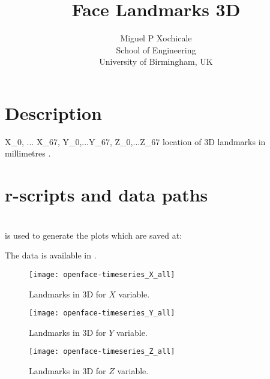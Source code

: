 \documentclass[a4paper,12pt]{article}
\title{Face Landmarks 3D}
\author{Miguel P Xochicale \\
School of Engineering\\
University of Birmingham, UK}
\begin{document}
\maketitle

%


\section{Description}



X\_0, ... X\_67, Y\_0,...Y\_67, Z\_0,...Z\_67 location of 3D landmarks in millimetres \cite{baltrusaitis2016}.




\section{r-scripts and data paths}
 \\
is used to generate the plots which are saved at: \\



The data is available in \cite{mxochicale2018}.











\begin{figure}
\centering
\texttt{[image: openface-timeseries\_X\_all]}
\caption{Landmarks in 3D for $X$ variable.}
\end{figure}

\begin{figure}
\centering
\texttt{[image: openface-timeseries\_Y\_all]}
\caption{Landmarks in 3D for $Y$ variable.}
\end{figure}

\begin{figure}
\centering
\texttt{[image: openface-timeseries\_Z\_all]}
\caption{Landmarks in 3D for $Z$ variable.}
\end{figure}
\end{document}
